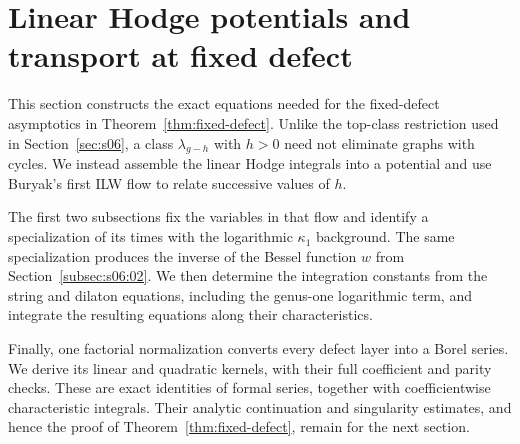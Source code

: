 \section{Linear Hodge potentials and transport at fixed defect}
\label{sec:s07}

This section constructs the exact equations needed for the fixed-defect
asymptotics in Theorem~\ref{thm:fixed-defect}. Unlike the top-class
restriction used in Section~\ref{sec:s06}, a class $\lambda_{g-h}$ with
$h>0$ need not eliminate graphs with cycles. We instead assemble the
linear Hodge integrals into a potential and use Buryak's first ILW flow
to relate successive values of $h$.

The first two subsections fix the variables in that flow and identify a
specialization of its times with the logarithmic $\kappa_1$ background.
The same specialization produces the inverse of the Bessel function
$w$ from Section~\ref{subsec:s06:02}. We then determine the integration
constants from the string and dilaton equations, including the
genus-one logarithmic term, and integrate the resulting equations along
their characteristics.

Finally, one factorial normalization converts every defect layer into a
Borel series. We derive its linear and quadratic kernels, with their
full coefficient and parity checks. These are exact identities of
formal series, together with coefficientwise characteristic integrals.
Their analytic continuation and singularity estimates, and hence the
proof of Theorem~\ref{thm:fixed-defect}, remain for the next section.





